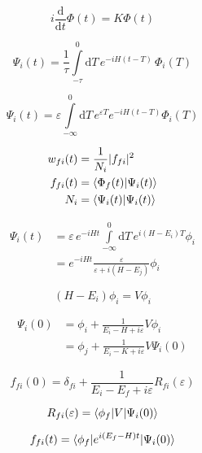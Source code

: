 \begin{equation}
  i \frac{\mathrm{d}}{\mathrm{d}t} \Phi(t) = K \Phi(t)
\end{equation}

\begin{equation}
  \Psi_i(t) = \frac 1\tau \int\limits_{-\tau}^0 \mathrm{d}T \,
              e^{-iH(t-T)} \, \Phi_i(T)
\end{equation}

\begin{equation}
  \Psi_i(t) = \varepsilon \int\limits_{-\infty}^0 \mathrm{d}T \,
              e^{\varepsilon T} e^{-iH(t-T)} \Phi_i(T)
\end{equation}

\begin{align}
  w_{fi}(t) &= \frac 1{N_i} |f_{fi}|^2 \\
  f_{fi}(t) &= \braket{\Phi_f(t)|\Psi_i(t)}\\
  N_i       &= \braket{\Psi_i(t)|\Psi_i(t)}
\end{align}

\begin{align}
   \Psi_i(t) &= \varepsilon \, e^{-iHt} \int\limits_{-\infty}^0 \mathrm{d}T \,
                e^{i(H-E_i)T} \phi_i\\
             &= e^{-iHt} \frac{\varepsilon}{\varepsilon+i(H-E_j)} \phi_i
\end{align}

\begin{equation}
  (H-E_i) \phi_i = V \phi_i
\end{equation}

\begin{align}
  \Psi_i(0) &= \phi_i + \frac{1}{E_i-H+i\varepsilon} V \phi_i \\
            &= \phi_j + \frac{1}{E_i-K+i\varepsilon} V \Psi_i(0)
\end{align}

\begin{equation}
  f_{fi}(0) = \delta_{fi} + \frac{1}{E_i-E_f+i\varepsilon} R_{fi}(\varepsilon)
\end{equation}

\begin{equation}
  R_{fi}(\varepsilon) = \braket{\phi_f|V|\Psi_i(0)}
\end{equation}

\begin{equation}
  f_{fi}(t) = \braket{\phi_f| e^{i(E_f-H)t} |\Psi_i(0)}
\end{equation}

